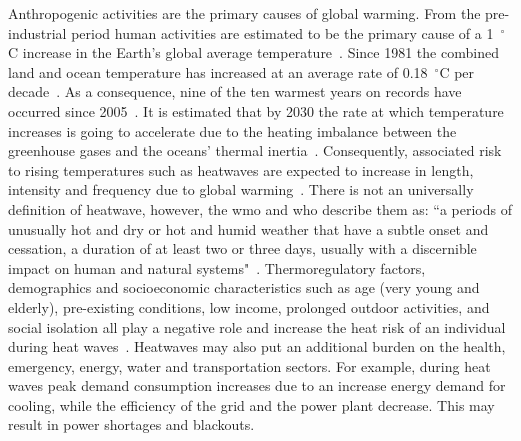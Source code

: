 Anthropogenic activities are the primary causes of global warming.
From the pre-industrial period human activities are estimated to be the primary cause of a 1~$^{\circ}$C increase in the Earth's global average temperature~\cite{GlobalWa91:online}.
Since 1981 the combined land and ocean temperature has increased at an average rate of 0.18~$^{\circ}$C per decade~\cite{GlobalCl28:online}.
As a consequence, nine of the ten warmest years on records have occurred since 2005~\cite{ClimateC26:online}.
It is estimated that by 2030 the rate at which temperature increases is going to accelerate due to the heating imbalance between the greenhouse gases and the oceans' thermal inertia~\cite{ClimateC26:online}.
Consequently, associated risk to rising temperatures such as heatwaves are expected to increase in length, intensity and frequency due to global warming~\cite{Whatharm75:online}.
There is not an universally definition of heatwave, however, the \ac{wmo} and \ac{who} describe them as: ``a periods of unusually hot and dry or hot and humid weather that have a subtle onset and cessation, a duration of at least two or three days, usually with a discernible impact on human and natural systems"~\cite{WMO2015}.
Thermoregulatory factors, demographics and socioeconomic characteristics such as age (very young and elderly), pre-existing conditions, low income, prolonged outdoor activities, and social isolation all play a negative role and increase the heat risk of an individual during heat waves~\cite{WMO2015}.
Heatwaves may also put an additional burden on the health, emergency, energy, water and transportation sectors.
For example, during heat waves peak demand consumption increases due to an increase energy demand for cooling, while the efficiency of the grid and the power plant decrease.
This may result in power shortages and blackouts.

